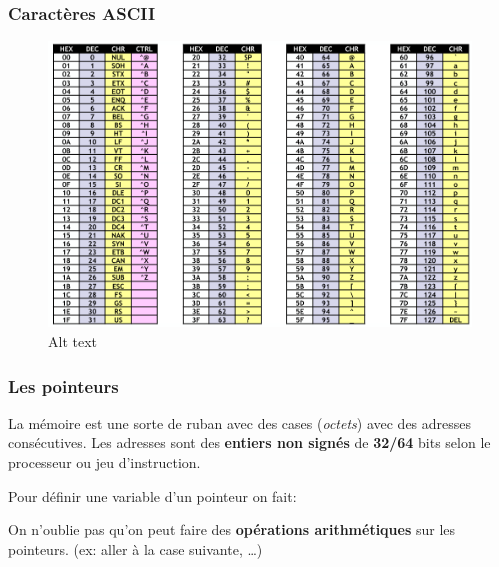\subsubsection{Caractères ASCII}\label{caractuxe8res-ascii}

\begin{figure}
\centering
\includegraphics{image-6.png}
\caption{Alt text}
\end{figure}

\subsubsection{Les pointeurs}\label{les-pointeurs}

La mémoire est une sorte de ruban avec des cases (\emph{octets}) avec
des adresses consécutives. Les adresses sont des \textbf{entiers non
signés} de \textbf{32/64} bits selon le processeur ou jeu d'instruction.

Pour définir une variable d'un pointeur on fait:

\begin{Shaded}
\begin{Highlighting}[]
\OperatorTok{*}\OperatorTok{;} 
\OperatorTok{\&}\OperatorTok{;} 
\OperatorTok{*}\OperatorTok{;} 
\end{Highlighting}
\end{Shaded}

On n'oublie pas qu'on peut faire des \textbf{opérations arithmétiques}
sur les pointeurs. (ex: aller à la case suivante, \ldots)

